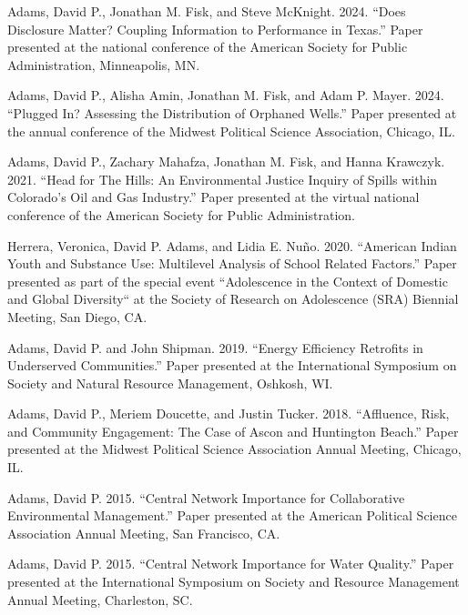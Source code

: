 \documentclass[11pt,letterpaper]{article}
\renewenvironment{itemize}{
  \begin{list}{}{
    \setlength{\leftmargin}{1.5em}
    \setlength{\itemsep}{0.25em}
    \setlength{\parskip}{0pt}
    \setlength{\parsep}{0.25em}
  }
}{
  \end{list}
}
\begin{document}
\begin{itemize}
    \item Adams, David P., Jonathan M. Fisk, and Steve McKnight. 2024. ``Does Disclosure Matter? Coupling Information to Performance in Texas.'' Paper presented at the national conference of the American Society for Public Administration, Minneapolis, MN.
    
    \item Adams, David P., Alisha Amin, Jonathan M. Fisk, and Adam P. Mayer. 2024. ``Plugged In? Assessing the Distribution of Orphaned Wells.'' Paper presented at the annual conference of the Midwest Political Science Association, Chicago, IL.

    \item Adams, David P., Zachary Mahafza, Jonathan M. Fisk, and Hanna Krawczyk. 2021. ``Head for The Hills: An Environmental Justice Inquiry of Spills within Colorado's Oil and Gas Industry.'' Paper presented at the virtual national conference of the American Society for Public Administration.

    \item Herrera, Veronica, David P. Adams, and Lidia E. Nuño. 2020. ``American Indian Youth and Substance Use: Multilevel Analysis of School Related Factors.'' Paper presented as part of the special event ``Adolescence in the Context of Domestic and Global Diversity`` at the Society of Research on Adolescence (SRA) Biennial Meeting, San Diego, CA.
    
    \item Adams, David P. and John Shipman. 2019. ``Energy Efficiency Retrofits in Underserved Communities.'' Paper presented at the International Symposium on Society and Natural Resource Management, Oshkosh, WI.
    
    \item Adams, David P., Meriem Doucette, and Justin Tucker. 2018. ``Affluence, Risk, and Community Engagement: The Case of Ascon and Huntington Beach.'' Paper presented at the Midwest Political Science Association Annual Meeting, Chicago, IL.
    
    \item Adams, David P. 2015. ``Central Network Importance for Collaborative Environmental Management.'' Paper presented at the American Political Science Association Annual Meeting, San Francisco, CA.
    
    \item Adams, David P. 2015. ``Central Network Importance for Water Quality.'' Paper presented at the International Symposium on Society and Resource Management Annual Meeting, Charleston, SC.
    

\end{itemize}
\end{document}
